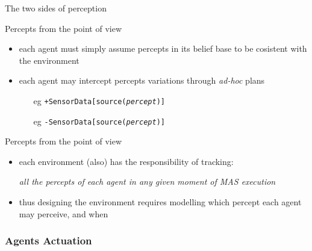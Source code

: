 \documentclass[presentation]{beamer}\mode<presentation>{\usetheme{AMSBolognaFC}}
\begin{document}
\begin{frame}[c]{The two sides of perception}
    
    \begin{block}{Percepts from the  point of view}
        \begin{itemize}
            \item each agent must simply \alert{assume} percepts in its belief base to be \alert{cosistent} with the environment
            \item each agent may intercept percepts \alert{variations} through \textit{ad-hoc} plans
            \begin{itemize}
                \item[eg] \texttt{\alert{+}SensorData[source(\textit{percept})]}
                \item[eg] \texttt{\alert{-}SensorData[source(\textit{percept})]}
            \end{itemize}
        \end{itemize}
    \end{block}
    
    \vfill
    
    \begin{block}{Percepts from the  point of view}
        \begin{itemize}
            \item each environment (also) has the \alert{responsibility} of tracking: 
            \begin{center}\small\itshape
                \alert{all} the percepts of \alert{each} agent in \alert{any} given moment of MAS execution
            \end{center}
            
            \item thus designing the environment requires modelling \alert{which} percept each agent may perceive, and \alert{when}
        \end{itemize}
    \end{block}
    
\end{frame} 

\subsubsection{Agents Actuation}
\end{document}
